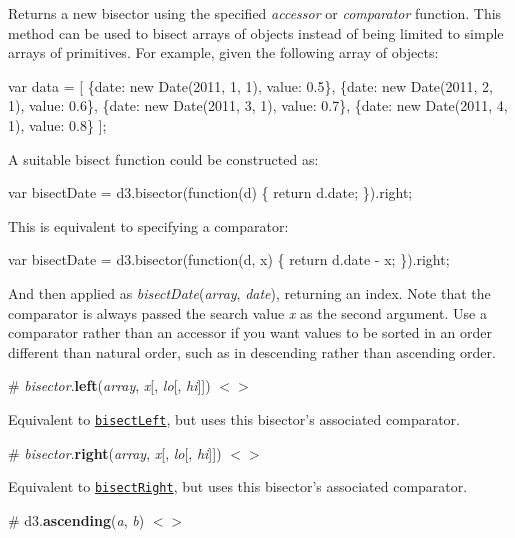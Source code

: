 Returns a new bisector using the specified {\itshape accessor} or {\itshape comparator} function. This method can be used to bisect arrays of objects instead of being limited to simple arrays of primitives. For example, given the following array of objects\+:


\begin{DoxyCode}
var data = [
  \{date: new Date(2011, 1, 1), value: 0.5\},
  \{date: new Date(2011, 2, 1), value: 0.6\},
  \{date: new Date(2011, 3, 1), value: 0.7\},
  \{date: new Date(2011, 4, 1), value: 0.8\}
];
\end{DoxyCode}


A suitable bisect function could be constructed as\+:


\begin{DoxyCode}
var bisectDate = d3.bisector(function(d) \{ return d.date; \}).right;
\end{DoxyCode}


This is equivalent to specifying a comparator\+:


\begin{DoxyCode}
var bisectDate = d3.bisector(function(d, x) \{ return d.date - x; \}).right;
\end{DoxyCode}


And then applied as {\itshape bisect\+Date}({\itshape array}, {\itshape date}), returning an index. Note that the comparator is always passed the search value {\itshape x} as the second argument. Use a comparator rather than an accessor if you want values to be sorted in an order different than natural order, such as in descending rather than ascending order.

\label{_bisector_left}%
\# {\itshape bisector}.{\bfseries left}({\itshape array}, {\itshape x}\mbox{[}, {\itshape lo}\mbox{[}, {\itshape hi}\mbox{]}\mbox{]}) \href{https://github.com/d3/d3-array/blob/master/src/bisector.js#L6}{\tt $<$$>$}

Equivalent to \href{#bisectLeft}{\tt bisect\+Left}, but uses this bisector’s associated comparator.

\label{_bisector_right}%
\# {\itshape bisector}.{\bfseries right}({\itshape array}, {\itshape x}\mbox{[}, {\itshape lo}\mbox{[}, {\itshape hi}\mbox{]}\mbox{]}) \href{https://github.com/d3/d3-array/blob/master/src/bisector.js#L16}{\tt $<$$>$}

Equivalent to \href{#bisectRight}{\tt bisect\+Right}, but uses this bisector’s associated comparator.

\label{_ascending}%
\# d3.{\bfseries ascending}({\itshape a}, {\itshape b}) \href{https://github.com/d3/d3-array/blob/master/src/ascending.js}{\tt $<$$>$}

